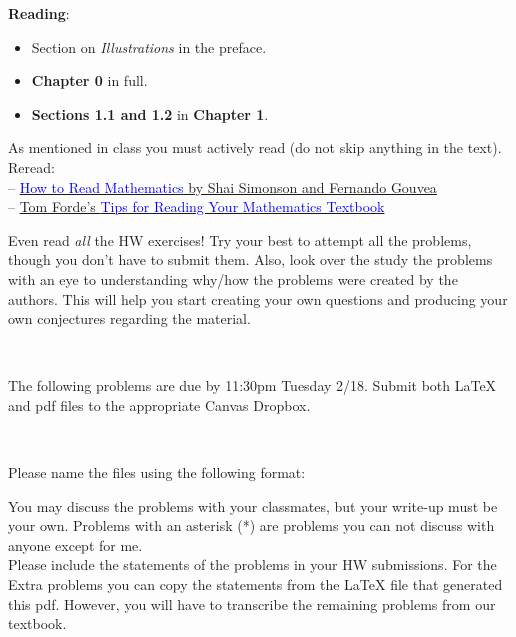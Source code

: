\documentclass[12pt]{article}
\begin{document}
{\bf Reading}: 
\begin{itemize}
\item Section on {\it Illustrations} in the preface.  
\item {\bf Chapter 0} in full. 
\item {\bf Sections 1.1 and 1.2} in {\bf Chapter 1}.
\end{itemize}
As mentioned in class you must actively read (do not skip anything in the text). Reread:\\
-- \href{https://www.people.vcu.edu/~dcranston/490/handouts/math-read.html}{\textcolor{blue}{How to Read Mathematics} by Shai Simonson and Fernando Gouvea}\\
-- \href{https://www.math.uh.edu/~tomforde/MathReadingTips.pdf}{Tom Forde's \textcolor{blue}{Tips for Reading Your Mathematics Textbook}}

\smallskip
Even read {\it all} the HW exercises! Try your best to attempt all the problems, though you don't have to submit them. Also, look over the study the problems with an eye to understanding why/how the problems were created by the authors. This will help you start creating your own questions and producing your own conjectures regarding the material. 

\hrulefill

\

The following problems are due by 11:30pm Tuesday 2/18.  Submit both LaTeX and pdf files to the appropriate Canvas Dropbox. 

\

Please name the files using the following format:
\begin{center}
\end{center}

You may discuss the problems with your classmates, but your write-up must be your own. Problems with an asterisk (*) are problems you can not discuss with anyone except for me.\\

Please include the statements of the problems in your HW submissions. For the Extra problems you can copy the statements from the LaTeX file that generated this pdf. However, you will have to transcribe the remaining problems from our textbook.

\hrulefill

\
\end{document}

